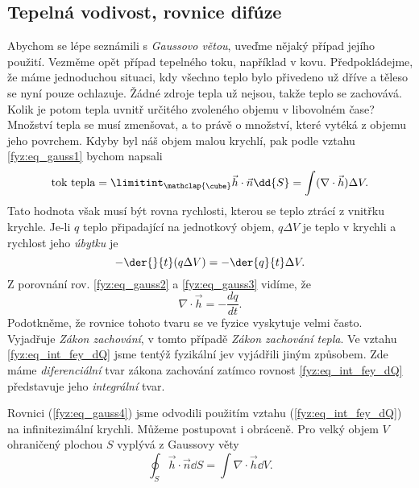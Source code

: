     \subsection{Tepelná vodivost, rovnice difúze}
      Abychom se lépe seznámili s \emph{Gaussovo větou}, uveďme nějaký případ jejího použití. 
      Vezměme opět případ tepelného toku, například v kovu. Předpokládejme, že máme jednoduchou 
      situaci, kdy všechno teplo bylo přivedeno už dříve a těleso se nyní pouze ochlazuje. Žádné 
      zdroje tepla už nejsou, takže teplo se zachovává. Kolik je potom tepla uvnitř určitého 
      zvoleného objemu v libovolném čase? Množství tepla se musí zmenšovat, a to právě o množství, 
      které vytéká z objemu jeho povrchem. Kdyby byl náš objem malou krychlí, pak podle vztahu
      \ref{fyz:eq_gauss1} bychom napsali
      \begin{equation}\label{fyz:eq_gauss2}
       \text{tok tepla}=\limitint_{\mathclap{\substack{\cube}}}\vec{h}\cdot\vec{n}\dd{S} = 
       \int(\nabla\cdot\vec{h})\Delta V.
      \end{equation}
      Tato hodnota však musí být rovna rychlosti, kterou se teplo ztrácí z vnitřku krychle. Je-li 
      $q$ teplo připadající na jednotkový objem, $q\Delta V$ je teplo v krychli a rychlost jeho
      \emph{úbytku} je
      \begin{equation}\label{fyz:eq_gauss3}
       - \der{ }{t}(q\Delta V) = - \der{q}{t}\Delta V.
      \end{equation}
      Z porovnání rov. \ref{fyz:eq_gauss2} a \ref{fyz:eq_gauss3} vidíme, že 
      \begin{equation}\label{fyz:eq_gauss4}
        \nabla\cdot\vec{h} = - \frac{dq}{dt}. 
      \end{equation}
      Podotkněme, že rovnice tohoto tvaru se ve fyzice vyskytuje velmi často. Vyjadřuje \emph{Zákon 
      zachování}, v tomto případě \emph{Zákon zachování tepla}. Ve vztahu \ref{fyz:eq_int_fey_dQ} 
      jsme tentýž fyzikální jev vyjádřili jiným způsobem. Zde máme \emph{diferenciální} tvar zákona 
      zachování zatímco rovnost \ref{fyz:eq_int_fey_dQ} představuje jeho \emph{integrální} tvar.
      
      Rovnici (\ref{fyz:eq_gauss4}) jsme odvodili použitím vztahu (\ref{fyz:eq_int_fey_dQ}) na 
      infinitezimální krychli. Můžeme postupovat i obráceně. Pro velký objem \(V\) ohraničený 
      plochou \(S\) vyplývá z Gaussovy věty
      \begin{equation}\label{fyz:eq_gauss5}
        \oint_S\vec{h}\cdot\vec{n}\dd{S} = \int\nabla\cdot\vec{h}\dd{V}.
      \end{equation}
      
